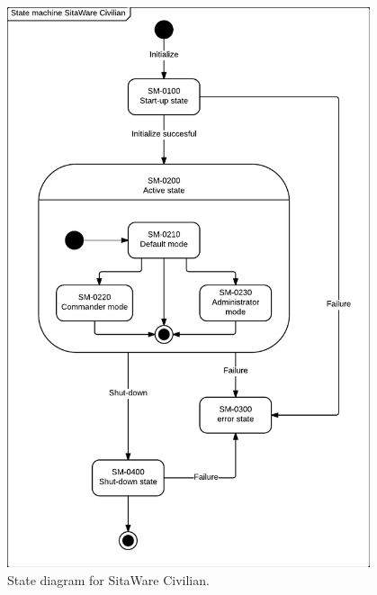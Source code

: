 \begin{figure}[H]
\centering
\includegraphics[width=0.95\textwidth]
{billeder/State_machine_PDD.pdf}
\caption{State diagram for SitaWare Civilian.}
\label{fig:stateDiagram}
\end{figure}